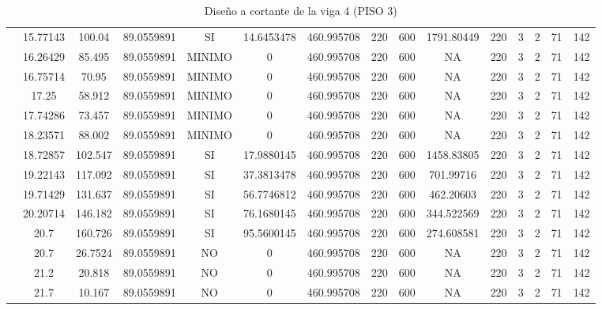 \begin{table}[H]
{\begin{tabular}{|c|c|c|c|c|c|c|c|c|c|c|c|c|c|c|}
\cline{2-15}    & 15.77143 & 100.04 & 89.0559891 & SI  & 14.6453478 & 460.995708 & 220 & 600 & 1791.80449 & 220 & 3   & 2   & 71  & 142 \bigstrut\\
\cline{2-15}    & 16.26429 & 85.495 & 89.0559891 & MINIMO & 0   & 460.995708 & 220 & 600 & NA  & 220 & 3   & 2   & 71  & 142 \bigstrut\\
\cline{2-15}    & 16.75714 & 70.95 & 89.0559891 & MINIMO & 0   & 460.995708 & 220 & 600 & NA  & 220 & 3   & 2   & 71  & 142 \bigstrut\\
\cline{2-15}    & 17.25 & 58.912 & 89.0559891 & MINIMO & 0   & 460.995708 & 220 & 600 & NA  & 220 & 3   & 2   & 71  & 142 \bigstrut\\
\cline{2-15}    & 17.74286 & 73.457 & 89.0559891 & MINIMO & 0   & 460.995708 & 220 & 600 & NA  & 220 & 3   & 2   & 71  & 142 \bigstrut\\
\cline{2-15}    & 18.23571 & 88.002 & 89.0559891 & MINIMO & 0   & 460.995708 & 220 & 600 & NA  & 220 & 3   & 2   & 71  & 142 \bigstrut\\
\cline{2-15}    & 18.72857 & 102.547 & 89.0559891 & SI  & 17.9880145 & 460.995708 & 220 & 600 & 1458.83805 & 220 & 3   & 2   & 71  & 142 \bigstrut\\
\cline{2-15}    & 19.22143 & 117.092 & 89.0559891 & SI  & 37.3813478 & 460.995708 & 220 & 600 & 701.99716 & 220 & 3   & 2   & 71  & 142 \bigstrut\\
\cline{2-15}    & 19.71429 & 131.637 & 89.0559891 & SI  & 56.7746812 & 460.995708 & 220 & 600 & 462.20603 & 220 & 3   & 2   & 71  & 142 \bigstrut\\
\cline{2-15}    & 20.20714 & 146.182 & 89.0559891 & SI  & 76.1680145 & 460.995708 & 220 & 600 & 344.522569 & 220 & 3   & 2   & 71  & 142 \bigstrut\\
\cline{2-15}    & 20.7 & 160.726 & 89.0559891 & SI  & 95.5600145 & 460.995708 & 220 & 600 & 274.608581 & 220 & 3   & 2   & 71  & 142 \bigstrut\\
\cline{2-15}    & 20.7 & 26.7524 & 89.0559891 & NO  & 0   & 460.995708 & 220 & 600 & NA  & 220 & 3   & 2   & 71  & 142 \bigstrut\\
\cline{2-15}    & 21.2 & 20.818 & 89.0559891 & NO  & 0   & 460.995708 & 220 & 600 & NA  & 220 & 3   & 2   & 71  & 142 \bigstrut\\
\cline{2-15}    & 21.7 & 10.167 & 89.0559891 & NO  & 0   & 460.995708 & 220 & 600 & NA  & 220 & 3   & 2   & 71  & 142 \bigstrut\\
\hline
\end{tabular}%

  


  

  }%
    \caption{Diseño a cortante de la viga 4 (PISO 3) }
  \label{tab:C VG4 P3 }%
\end{table}%

